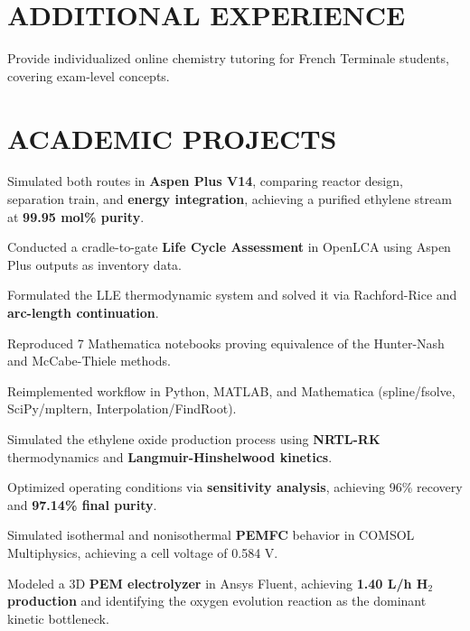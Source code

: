 \documentclass[10pt]{article}
\begin{document}
\section{ADDITIONAL EXPERIENCE}
\begin{bul}
\item Provide individualized online chemistry tutoring for French Terminale students, covering exam-level concepts.
\end{bul}

\section{ACADEMIC PROJECTS}
\begin{bul}
\item Simulated both routes in \textbf{Aspen Plus V14}, comparing reactor design, separation train, and \textbf{energy integration}, achieving a purified ethylene stream at \textbf{99.95 mol\% purity}.
\item Conducted a cradle-to-gate \textbf{Life Cycle Assessment} in OpenLCA using Aspen Plus outputs as inventory data.
\end{bul}
\begin{bul}
\item Formulated the LLE thermodynamic system and solved it via Rachford-Rice and \textbf{arc-length continuation}.
\item Reproduced 7 Mathematica notebooks proving equivalence of the Hunter-Nash and McCabe-Thiele methods.
\item Reimplemented workflow in Python, MATLAB, and Mathematica (spline/fsolve, SciPy/mpltern, Interpolation/FindRoot).
\end{bul}
\begin{bul}
\item Simulated the ethylene oxide production process using \textbf{NRTL-RK} thermodynamics and \textbf{Langmuir-Hinshelwood kinetics}.
\item Optimized operating conditions via \textbf{sensitivity analysis}, achieving 96\% recovery and \textbf{97.14\% final purity}.
\end{bul}
\begin{bul}
\item Simulated isothermal and nonisothermal \textbf{PEMFC} behavior in COMSOL Multiphysics, achieving a cell voltage of 0.584 V.
\item Modeled a 3D \textbf{PEM electrolyzer} in Ansys Fluent, achieving \textbf{1.40 L/h H$_2$ production} and identifying the oxygen evolution reaction as the dominant kinetic bottleneck.
\end{bul}
\end{document}
